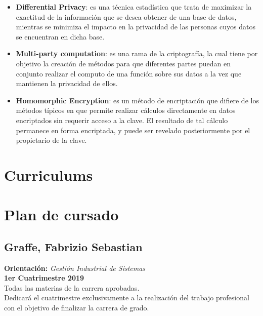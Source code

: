 \documentclass[
11pt, %
oneside, %
spanish, %
singlespacing, %
headsepline, %
chapterinoneline, %
]{MastersDoctoralThesis} %
\begin{document}
\begin{itemize}
\item \textbf{Differential Privacy}: es una técnica estadística que trata de maximizar la exactitud de la información que se desea obtener de una base de datos, mientras se minimiza el impacto  en la privacidad de las personas cuyos datos se encuentran en dicha base.
\item \textbf{Multi-party computation}: es una rama de la criptografía, la cual tiene por objetivo la creación de métodos para que diferentes partes puedan en conjunto realizar el computo de una función sobre sus datos a la vez que mantienen la privacidad de ellos.
\item \textbf{Homomorphic Encryption}: es un método de encriptación que difiere de los métodos típicos en que permite realizar cálculos directamente en datos encriptados sin requerir acceso a la clave. El resultado de tal cálculo permanece en forma encriptada, y puede ser revelado posteriormente por el propietario de la clave.
\end{itemize}



\chapter{Curriculums}






\chapter{Plan de cursado}

\section*{Graffe, Fabrizio Sebastian} 
\raggedright\textbf{Orientación:} \textit{Gestión Industrial de Sistemas} \\
\textbf{1er Cuatrimestre 2019} \\
Todas las materias de la carrera aprobadas. \\ 
Dedicará el cuatrimestre exclusivamente a la realización del trabajo profesional con el objetivo de finalizar la carrera de grado.
\end{document}
